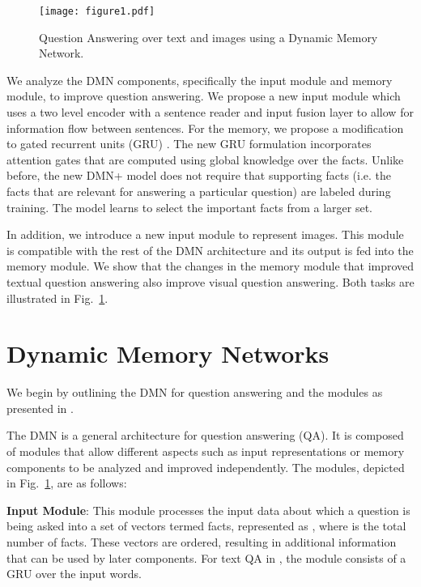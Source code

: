 \documentclass{article}
\begin{document}
\begin{figure}[t]
\centering
\texttt{[image: figure1.pdf]}
\vspace{-0.3cm}
\caption{Question Answering over text and images using a Dynamic Memory Network.}
\vspace{-0.6cm}
\label{fig:fig1}
\end{figure}

We analyze the DMN components, specifically the input module and memory module, to improve question answering.
We propose a new input module which uses a two level encoder with a sentence reader and input fusion layer to allow for information flow between sentences. 
For the memory, we propose a modification to gated recurrent units (GRU) \cite{Chung2014}. The new GRU formulation incorporates attention gates  that are computed using global knowledge over the facts.
Unlike before, the new DMN+ model does not require that supporting facts (i.e. the facts that are relevant for answering a particular question) are labeled during training. The model learns to select the important facts from a larger set.

In addition, we introduce a new input module to represent images. This module is compatible with the rest of the DMN architecture and its output is fed into the memory module. We show that the changes in the memory module that improved textual question answering also improve visual question answering. Both tasks are illustrated in Fig.~\ref{fig:fig1}. 


\section{Dynamic Memory Networks}
We begin by outlining the DMN for question answering and the modules as presented in \citet{Kumar2015}. 

The DMN is a general architecture for question answering (QA). It is composed of modules that allow different aspects such as input representations or memory components to be analyzed and improved independently. 
The modules, depicted in Fig.~\ref{fig:fig1}, are as follows:

\textbf{Input Module}:
This module processes the input data about which a question is being asked into a set of vectors termed facts, represented as , where  is the total number of facts.
These vectors are ordered, resulting in additional information that can be used by later components.
For text QA in \citet{Kumar2015}, the module consists of a GRU over the input words.
\end{document}
